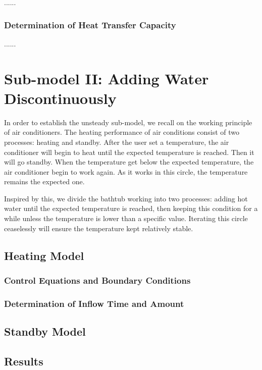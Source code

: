 \documentclass{mcmthesis}
\begin{document}
......

\subsubsection{Determination of Heat Transfer Capacity}

......

\section{Sub-model II: Adding Water Discontinuously}

In order to establish the unsteady sub-model, we recall on the working principle of air conditioners. The heating performance of air conditions consist of two processes: heating and standby. After the user set a temperature, the air conditioner will begin to heat until the expected temperature is reached. Then it will go standby. When the temperature get below the expected temperature, the air conditioner begin to work again. As it works in this circle, the temperature remains the expected one.

Inspired by this, we divide the bathtub working into two processes: adding
hot water until the expected temperature is reached, then keeping this
condition for a while unless the temperature is lower than a specific value. Iterating this circle ceaselessly will ensure the temperature kept relatively stable.

\subsection{Heating Model}

\subsubsection{Control Equations and Boundary Conditions}

\subsubsection{Determination of Inflow Time and Amount}

\subsection{Standby Model}



\subsection{Results}
\end{document}
